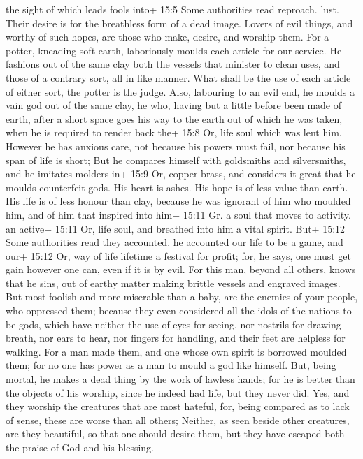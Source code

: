  the sight of which leads fools into+ 15:5 Some authorities
read reproach. lust. Their desire is for the breathless form of a dead
image.  Lovers of evil things, and worthy of such hopes, are
those who make, desire, and worship them.  For a potter,
kneading soft earth, laboriously moulds each article for our service. He
fashions out of the same clay both the vessels that minister to clean
uses, and those of a contrary sort, all in like manner. What shall be
the use of each article of either sort, the potter is the judge.
 Also, labouring to an evil end, he moulds a vain god out of
the same clay, he who, having but a little before been made of earth,
after a short space goes his way to the earth out of which he was taken,
when he is required to render back the+ 15:8 Or, life soul which was
lent him.  However he has anxious care, not because his
powers must fail, nor because his span of life is short; But he compares
himself with goldsmiths and silversmiths, and he imitates molders in+
15:9 Or, copper brass, and considers it great that he moulds counterfeit
gods.  His heart is ashes. His hope is of less value than
earth. His life is of less honour than clay,  because he
was ignorant of him who moulded him, and of him that inspired into him+
15:11 Gr. a soul that moves to activity. an active+ 15:11 Or, life soul,
and breathed into him a vital spirit.  But+ 15:12 Some
authorities read they accounted. he accounted our life to be a game, and
our+ 15:12 Or, way of life lifetime a festival for profit; for, he says,
one must get gain however one can, even if it is by evil. 
For this man, beyond all others, knows that he sins, out of earthy
matter making brittle vessels and engraved images.  But
most foolish and more miserable than a baby, are the enemies of your
people, who oppressed them;  because they even considered
all the idols of the nations to be gods, which have neither the use of
eyes for seeing, nor nostrils for drawing breath, nor ears to hear, nor
fingers for handling, and their feet are helpless for walking.
 For a man made them, and one whose own spirit is borrowed
moulded them; for no one has power as a man to mould a god like himself.
 But, being mortal, he makes a dead thing by the work of
lawless hands; for he is better than the objects of his worship, since
he indeed had life, but they never did.  Yes, and they
worship the creatures that are most hateful, for, being compared as to
lack of sense, these are worse than all others;  Neither,
as seen beside other creatures, are they beautiful, so that one should
desire them, but they have escaped both the praise of God and his
blessing.

